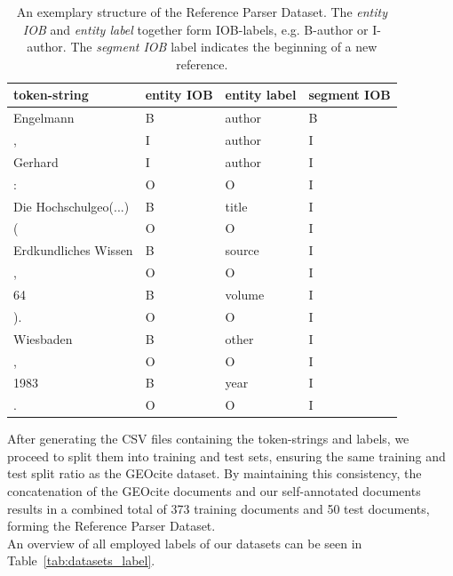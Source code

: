 \begin{table}[!ht]
    \centering
    \begin{tabular}{|l|l|l|l|}
        \hline
        \textbf{token-string} & \textbf{entity IOB} & \textbf{entity label} & \textbf{segment IOB} \\ \hline \hline
        Engelmann & B & author & B \\ \hline
        ,  & I & author & I \\ \hline
        Gerhard & I & author & I \\ \hline
        : & O & O & I \\ \hline
        Die Hochschulgeo(...) & B & title & I \\ \hline
        ( & O & O & I \\ \hline
        Erdkundliches Wissen & B & source & I \\ \hline
        , & O & O & I \\ \hline
        64 & B & volume & I \\ \hline
        ). & O & O & I \\ \hline
        Wiesbaden & B & other & I \\ \hline
        , & O & O & I \\ \hline
        1983 & B & year & I \\ \hline
        . & O & O & I \\ \hline
    \end{tabular}
    \label{tab:reference_segmented}
    \caption{An exemplary structure of the Reference Parser Dataset. The \textit{entity IOB} and \textit{entity label} together form IOB-labels, e.g. B-author or I-author. The \textit{segment IOB} label indicates the beginning of a new reference.}
\end{table}

After generating the CSV files containing the token-strings and labels, we proceed to split them into training and test sets, ensuring the same training and test split ratio as the GEOcite dataset. By maintaining this consistency, the concatenation of the GEOcite documents and our self-annotated documents results in a combined total of 373 training documents and 50 test documents, forming the Reference Parser Dataset.\\
An overview of all employed labels of our datasets can be seen in Table~\ref{tab:datasets_label}.

